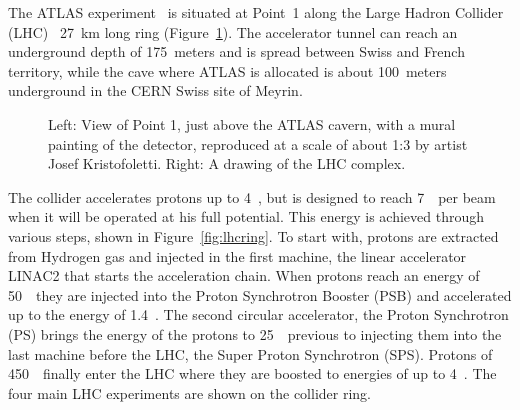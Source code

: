 The ATLAS experiment~\cite{Aad:2008zzm} is situated at Point~1 along the Large Hadron Collider 
(LHC)~\cite{lhc} 27~km long ring (Figure~\ref{fig:nicepics}).
The accelerator
tunnel can reach an underground depth of 175~meters and is spread between Swiss
and French territory, while the cave where ATLAS is allocated is about 100~meters 
underground in the CERN Swiss site of Meyrin.

\begin{figure}[tb]\begin{center}
	\caption[bla]{Left: View of Point 1, just above the ATLAS cavern, with a mural painting 
        of the detector, reproduced at a scale of about 1:3
        by artist Josef Kristofoletti\footnotemark.
        Right: A drawing of the LHC complex.\label{fig:nicepics}}
\end{center}\end{figure}

The collider accelerates protons up to 4~\tev, but is designed to reach 7~\tev\ per beam
when it will be operated at his full potential. This energy is achieved
through various steps, shown in Figure~\ref{fig:lhcring}.
To start with, protons are extracted from Hydrogen gas and injected in the first machine, the linear 
accelerator LINAC2 that starts the acceleration chain. When protons reach
an energy of 50~\mev\ they are injected into the Proton Synchrotron Booster
(PSB) and accelerated up to the energy of 1.4~\gev. The second circular
accelerator, the Proton Synchrotron (PS) brings the energy of the protons
to 25~\gev\ previous to injecting them into the last machine before the LHC,
the Super Proton Synchrotron (SPS). Protons of 450~\gev\ finally enter the
LHC where they are boosted to energies of up to 4~\tev.
The four main LHC experiments are shown on the collider ring.

